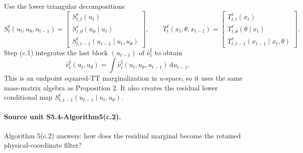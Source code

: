 \documentclass[11pt]{article}
\newcommand{\dd}{\,\mathrm d}
\begin{document}
Use
the lower triangular decompositions
\[
    S_t^{\ell}(u_t,u_\theta,u_{t-1})
    =
    \begin{bmatrix}
    S_{t,t}^{\ell}(u_t)\\
    S_{t,\theta}^{\ell}(u_\theta\mid u_t)\\
    S_{t,t-1}^{\ell}(u_{t-1}\mid u_t,u_\theta)
    \end{bmatrix},
    \qquad
    T_t^{\ell}(x_t,\theta,x_{t-1})
    =
    \begin{bmatrix}
    T_{t,t}^{\ell}(x_t)\\
    T_{t,\theta}^{\ell}(\theta\mid x_t)\\
    T_{t,t-1}^{\ell}(x_{t-1}\mid x_t,\theta)
    \end{bmatrix}.
    \tag{P14}
\]
Step (c.1) integrates the last block \((u_{t-1})\) of
\(\widehat\nu_t^\sharp\) to obtain
\[
    \widehat\nu_t^\sharp(u_t,u_\theta)
    =
    \int\widehat\nu_t^\sharp(u_t,u_\theta,u_{t-1})\dd u_{t-1}.
    \tag{P15}
\]
This is an endpoint squared-TT marginalization in \(u\)-space, so it uses the
same mass-matrix algebra as Proposition 2.  It also creates the residual lower
conditional map \(S_{t,t-1}^{\ell}(u_{t-1}\mid u_t,u_\theta)\).

\paragraph{Source unit S5.4-Algorithm5(c.2).}
Algorithm 5(c.2) answers: how does the residual marginal become the retained
physical-coordinate filter?
\end{document}
